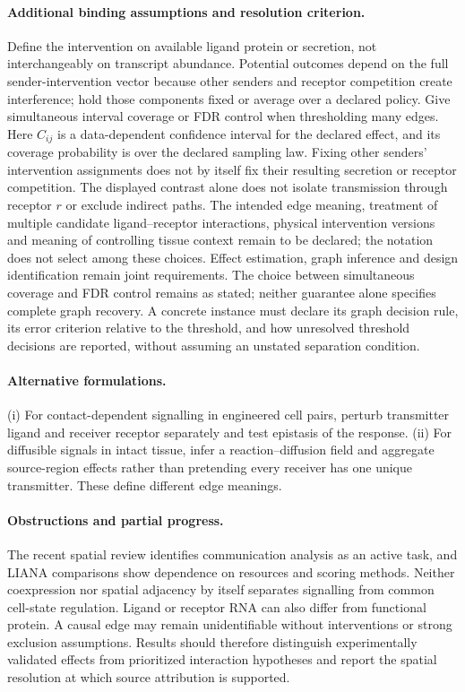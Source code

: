 \documentclass[11pt]{article}
\begin{document}
\paragraph{Additional binding assumptions and resolution criterion.} Define the intervention on available ligand protein or secretion, not interchangeably on transcript abundance. Potential outcomes depend on the full sender-intervention vector because other senders and receptor competition create interference; hold those components fixed or average over a declared policy. Give simultaneous interval coverage or FDR control when thresholding many edges. Here $C_{ij}$ is a data-dependent confidence interval for the declared effect, and its coverage probability is over the declared sampling law. Fixing other senders' intervention assignments does not by itself fix their resulting secretion or receptor competition. The displayed contrast alone does not isolate transmission through receptor $r$ or exclude indirect paths. The intended edge meaning, treatment of multiple candidate ligand--receptor interactions, physical intervention versions and meaning of controlling tissue context remain to be declared; the notation does not select among these choices. Effect estimation, graph inference and design identification remain joint requirements. The choice between simultaneous coverage and FDR control remains as stated; neither guarantee alone specifies complete graph recovery. A concrete instance must declare its graph decision rule, its error criterion relative to the threshold, and how unresolved threshold decisions are reported, without assuming an unstated separation condition.

\paragraph{Alternative formulations.} (i) For contact-dependent signalling in engineered cell pairs, perturb transmitter ligand and receiver receptor separately and test epistasis of the response. (ii) For diffusible signals in intact tissue, infer a reaction--diffusion field and aggregate source-region effects rather than pretending every receiver has one unique transmitter. These define different edge meanings.
\paragraph{Obstructions and partial progress.} The recent spatial review identifies communication analysis as an active task, and LIANA comparisons show dependence on resources and scoring methods. Neither coexpression nor spatial adjacency by itself separates signalling from common cell-state regulation. Ligand or receptor RNA can also differ from functional protein. A causal edge may remain unidentifiable without interventions or strong exclusion assumptions. Results should therefore distinguish experimentally validated effects from prioritized interaction hypotheses and report the spatial resolution at which source attribution is supported.
\end{document}
